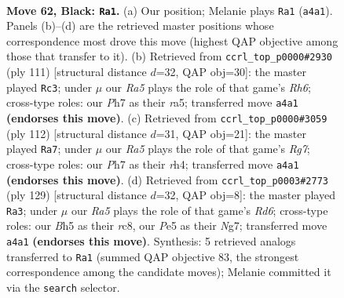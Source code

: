 \documentclass[11pt]{article}
\begin{document}
\clearpage

\begin{figure}[p]\centering
\begin{subfigure}{0.46\textwidth}\centering
\resizebox{\linewidth}{!}{%
\newchessgame
\chessboard[
  setfen={8/7p/4k3/1K2p2b/rp6/8/4n1r1/8 b - - 15 62},
  showmover=false,
  pgfstyle=straightmove, color=movearrow, markmove={a4-a1}
]}
\caption{}
\end{subfigure}\hfill
\begin{subfigure}{0.46\textwidth}\centering
\resizebox{\linewidth}{!}{%
\newchessgame
\chessboard[
  setfen={6k1/6p1/8/R7/6Kp/7r/8/8 b - - 1 56},
  showmover=false,
  pgfstyle=straightmove, color=movearrow, markmove={h3-c3}
]}
\caption{}
\end{subfigure}
\\[4pt]
\begin{subfigure}{0.46\textwidth}\centering
\resizebox{\linewidth}{!}{%
\newchessgame
\chessboard[
  setfen={8/6RP/5k2/8/7r/5K2/5P2/8 w - - 5 57},
  showmover=false,
  pgfstyle=straightmove, color=movearrow, markmove={g7-a7}
]}
\caption{}
\end{subfigure}\hfill
\begin{subfigure}{0.46\textwidth}\centering
\resizebox{\linewidth}{!}{%
\newchessgame
\chessboard[
  setfen={2R5/6nk/8/4N3/P2p4/3r4/5K2/8 b - - 3 65},
  showmover=false,
  pgfstyle=straightmove, color=movearrow, markmove={d3-a3}
]}
\caption{}
\end{subfigure}
\caption{\textbf{Move 62, Black: \texttt{Ra1}.} (a) Our position; Melanie plays \texttt{Ra1} (\texttt{a4a1}). Panels (b)--(d) are the retrieved master positions whose correspondence most drove this move (highest QAP objective among those that transfer to it). (b) Retrieved from \texttt{ccrl\_top\_p0000\#2930} (ply 111) [structural distance $d$=32, QAP obj=30]: the master played \texttt{Rc3}; under $\mu$ our \emph{Ra5} plays the role of that game's \emph{Rh6}; cross-type roles: our \emph{P}h7 as their \emph{r}a5; transferred move \texttt{a4a1} \textbf{(endorses this move)}. (c) Retrieved from \texttt{ccrl\_top\_p0000\#3059} (ply 112) [structural distance $d$=31, QAP obj=21]: the master played \texttt{Ra7}; under $\mu$ our \emph{Ra5} plays the role of that game's \emph{Rg7}; cross-type roles: our \emph{P}h7 as their \emph{r}h4; transferred move \texttt{a4a1} \textbf{(endorses this move)}. (d) Retrieved from \texttt{ccrl\_top\_p0003\#2773} (ply 129) [structural distance $d$=32, QAP obj=8]: the master played \texttt{Ra3}; under $\mu$ our \emph{Ra5} plays the role of that game's \emph{Rd6}; cross-type roles: our \emph{B}h5 as their \emph{r}c8, our \emph{P}e5 as their \emph{N}g7; transferred move \texttt{a4a1} \textbf{(endorses this move)}. Synthesis: 5 retrieved analogs transferred to \texttt{Ra1} (summed QAP objective 83, the strongest correspondence among the candidate moves); Melanie committed it via the \texttt{search} selector.}
\label{fig:thought-m123}
\end{figure}
\end{document}
